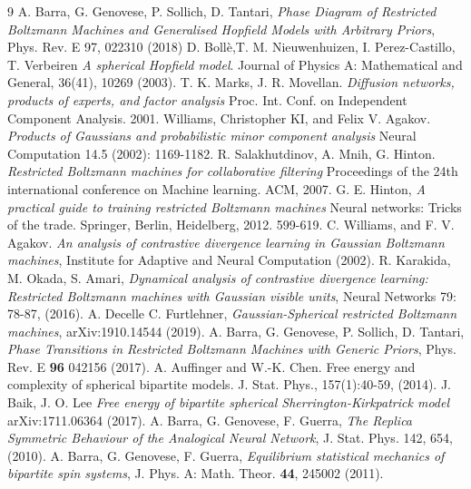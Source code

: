 \documentclass[10pt,oneside,a4paper,reqno]{amsart}  %
\theoremstyle{plain}
\numberwithin{equation}{section}
\begin{document}
\begin{thebibliography}{9}
%
 A. Barra, G. Genovese, P. Sollich, D. Tantari, {\em Phase Diagram of Restricted Boltzmann Machines and Generalised Hopfield Models with Arbitrary Priors}, Phys. Rev. E 97, 022310 (2018)
%
 D. Boll\`e,T. M. Nieuwenhuizen, I. Perez-Castillo, T. Verbeiren {\em A spherical Hopfield model}. Journal of Physics A: Mathematical and General, 36(41), 10269 (2003).
%
T. K. Marks, J. R. Movellan. {\em Diffusion networks, products of experts, and factor analysis} Proc. Int. Conf. on Independent Component Analysis. 2001.
%
 Williams, Christopher KI, and Felix V. Agakov. {\em Products of Gaussians and probabilistic minor component analysis} Neural Computation 14.5 (2002): 1169-1182.
%
 R. Salakhutdinov, A. Mnih, G. Hinton. {\em Restricted Boltzmann machines for collaborative filtering} Proceedings of the 24th international conference on Machine learning. ACM, 2007.
%
 G. E. Hinton, {\em A practical guide to training restricted Boltzmann machines} Neural networks: Tricks of the trade. Springer, Berlin, Heidelberg, 2012. 599-619.
%
 C. Williams, and F. V. Agakov. {\em An analysis of contrastive divergence learning in Gaussian Boltzmann machines}, Institute for Adaptive and Neural Computation (2002).
 R. Karakida, M. Okada, S. Amari, {\em Dynamical analysis of contrastive divergence learning: Restricted Boltzmann machines with Gaussian visible units}, Neural Networks 79: 78-87, (2016).
 A. Decelle C. Furtlehner, {\em Gaussian-Spherical restricted Boltzmann machines}, arXiv:1910.14544 (2019).
%
 A. Barra, G. Genovese, P. Sollich, D. Tantari, {\em Phase Transitions in Restricted Boltzmann Machines with Generic Priors}, Phys. Rev. E {\bf 96} 042156 (2017).
%
 A. Auffinger and W.-K. Chen. Free energy and complexity of spherical bipartite models. J. Stat. Phys., 157(1):40-59, (2014).
%
 J. Baik, J. O. Lee {\em Free energy of bipartite spherical Sherrington-Kirkpatrick model} arXiv:1711.06364 (2017).
%
 A. Barra, G. Genovese, F. Guerra, {\em The Replica Symmetric Behaviour of the Analogical Neural Network}, J. Stat. Phys. 142, 654, (2010).
%
 A. Barra, G. Genovese, F. Guerra, \textit{Equilibrium statistical mechanics of bipartite spin systems}, J. Phys. A: Math. Theor. \textbf{44}, 245002 (2011).

\end{thebibliography}
\end{document}
